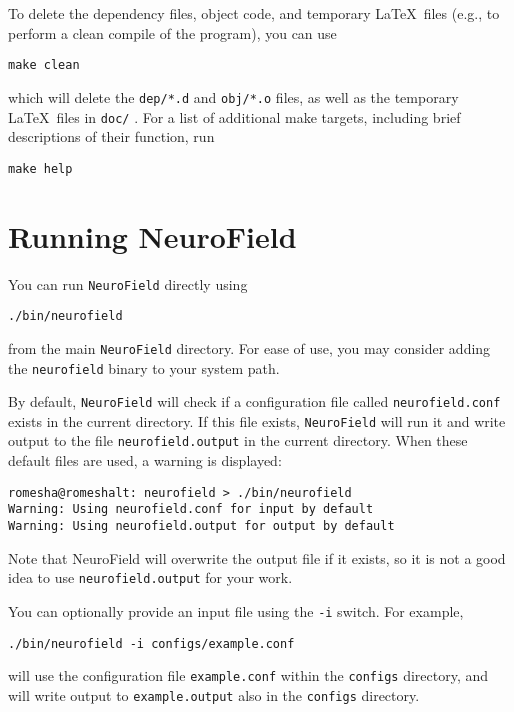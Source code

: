\documentclass[12pt,a4paper]{article}
\newcommand{\type}[1]{{\small\small\tt #1} }
\newcommand{\NF}[0]{\type{NeuroField}}
\begin{document}
To delete the dependency files, object code, and temporary \LaTeX\ files (e.g., to perform a clean compile of the program), you can use
\begin{lstlisting}
make clean
\end{lstlisting}
which will delete the \type{dep/*.d} and \type{obj/*.o} files, as well as the temporary \LaTeX\ files in \type{doc/}. For a list of additional make targets, including brief descriptions of their function, run
\begin{lstlisting}
make help
\end{lstlisting}

\section{Running NeuroField}
\label{sec:running}
You can run \NF directly using

\begin{lstlisting}
./bin/neurofield
\end{lstlisting}

from the main \NF directory. For ease of use, you may consider adding the \type{neurofield} binary to your system path.

By default, \NF will check if a configuration file called \type{neurofield.conf} exists in the current directory. If this file exists, \NF will run it and write output to the file \type{neurofield.output} in the current directory. When these default files are used, a warning is displayed:

\begin{lstlisting}
romesha@romeshalt: neurofield > ./bin/neurofield
Warning: Using neurofield.conf for input by default
Warning: Using neurofield.output for output by default
\end{lstlisting}

Note that NeuroField will overwrite the output file if it exists, so it is not a good idea to use \type{neurofield.output} for your work.

You can optionally provide an input file using the \type{-i} switch. For example,

\begin{lstlisting}
./bin/neurofield -i configs/example.conf
\end{lstlisting}

will use the configuration file \type{example.conf} within the \type{configs} directory, and will write output to \type{example.output} also in the \type{configs} directory.
\end{document}
